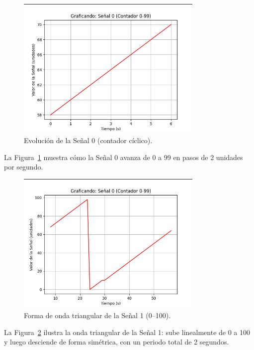 \begin{figure}[H]
  \centering
  \includegraphics[width=0.8\textwidth]{img/graphic.png}
  \caption{Evolución de la Señal 0 (contador cíclico).}
  \label{fig:signal0}
\end{figure}

La Figura~\ref{fig:signal0} muestra cómo la Señal 0 avanza de 0 a 99 en pasos de 2 unidades por segundo. 

\begin{figure}[H]
  \centering
  \includegraphics[width=0.8\textwidth]{img/graphic2.png}
  \caption{Forma de onda triangular de la Señal 1 (0–100).}
  \label{fig:signal1}
\end{figure}

La Figura~\ref{fig:signal1} ilustra la onda triangular de la Señal 1: sube linealmente de 0 a 100 y luego desciende de forma simétrica, con un periodo total de 2 segundos.

\FloatBarrier